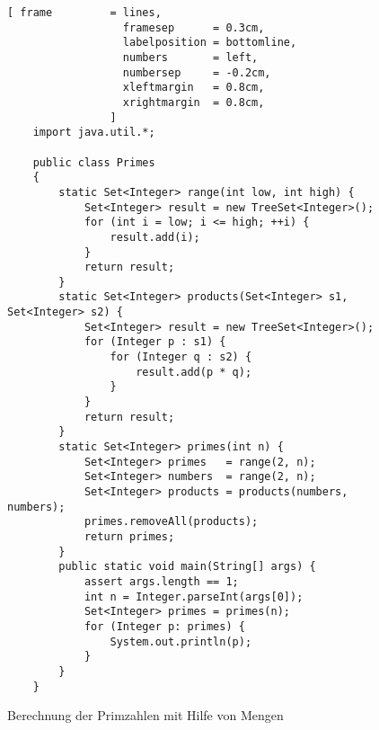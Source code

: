 \begin{figure}[!h]
\centering
\begin{Verbatim}[ frame         = lines, 
                  framesep      = 0.3cm, 
                  labelposition = bottomline,
                  numbers       = left,
                  numbersep     = -0.2cm,
                  xleftmargin   = 0.8cm,
                  xrightmargin  = 0.8cm,
                ]
    import java.util.*;
    
    public class Primes 
    {
        static Set<Integer> range(int low, int high) {
            Set<Integer> result = new TreeSet<Integer>();
            for (int i = low; i <= high; ++i) {
                result.add(i);
            }
            return result;
        }
        static Set<Integer> products(Set<Integer> s1, Set<Integer> s2) {
            Set<Integer> result = new TreeSet<Integer>();
            for (Integer p : s1) {
                for (Integer q : s2) {
                    result.add(p * q);
                }
            }
            return result;
        }
        static Set<Integer> primes(int n) {
            Set<Integer> primes   = range(2, n);
            Set<Integer> numbers  = range(2, n);
            Set<Integer> products = products(numbers, numbers);
            primes.removeAll(products);
            return primes;
        }    
        public static void main(String[] args) {
            assert args.length == 1;
            int n = Integer.parseInt(args[0]);
            Set<Integer> primes = primes(n);
            for (Integer p: primes) {
                System.out.println(p);
            }
        }
    }
\end{Verbatim}
\vspace*{-0.3cm}
\caption{Berechnung der Primzahlen mit Hilfe von Mengen}
\label{fig:Primes.java}
\end{figure}


